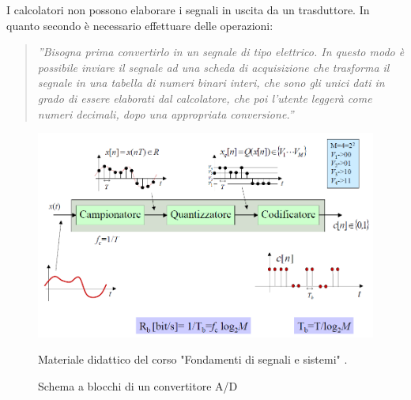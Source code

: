 \documentclass[a4paper]{report} %
\begin{document}
I calcolatori non possono elaborare i segnali in uscita da un trasduttore. In quanto secondo \cite{art:rif.2} è necessario effettuare delle operazioni: 
\begin{quote}
	\textit{''Bisogna prima convertirlo in un segnale di tipo elettrico. In questo modo è possibile inviare il segnale ad una scheda di acquisizione che trasforma il segnale in una tabella di numeri binari interi, che sono gli unici dati in grado di essere elaborati dal calcolatore, che poi l'utente leggerà come numeri decimali, dopo una appropriata conversione.''}
\end{quote}

 
\begin{figure}
	\centering
	\includegraphics[scale=.4]{Immagini/schemaAD.png}
	
	\caption{Schema a blocchi di un convertitore A/D}
	\label{fig:schemaconvertitore}
	Materiale didattico del corso "Fondamenti di segnali e sistemi" \cite{art:rif.7}.
\end{figure}
\end{document}
